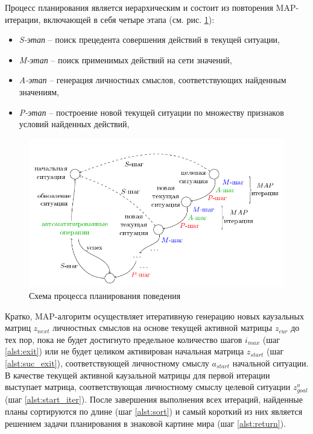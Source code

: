 \documentclass[12pt]{scrartcl}
\begin{document}
	Процесс планирования является иерархическим и состоит из повторения	MAP-итерации, включающей в себя четыре этапа (см. рис. \ref{fig:plan_algo}):
	\begin{itemize}
		\item \textit{S-этап} -- поиск прецедента совершения действий в текущей ситуации,
		\item \textit{M-этап} -- поиск применимых действий на сети значений,
		\item \textit{A-этап} -- генерация личностных смыслов, соответствующих найденным значениям,
		\item \textit{P-этап} -- построение новой текущей ситуации по множеству признаков условий найденных действий,
	\end{itemize}

	\begin{figure}
		\centering
		\includegraphics[width=\textwidth]{algo/ru/beh_plan2_ru}
		\caption{Схема процесса планирования поведения}	
		\label{fig:plan_algo}	
	\end{figure}
	
	Кратко, MAP-алгоритм осуществляет итеративную генерацию новых каузальных матриц $z_{next}$ личностных смыслов на основе текущей активной матрицы $z_{cur}$ до тех пор, пока не будет достигнуто предельное количество шагов $i_{max}$ (шаг \ref{alst:exit}) или не будет целиком активирован начальная матрица $z_{start}$ (шаг \ref{alst:suc_exit}), соответствующей личностному смыслу $a_{start}$ начальной ситуации. В качестве текущей активной каузальной матрицы для первой итерации выступает матрица, соответствующая личностному смыслу целевой ситуации $z_{goal}^a$ (шаг \ref{alst:start_iter}). После завершения выполнения всех итераций, найденные планы сортируются по длине (шаг \ref{alst:sort}) и самый короткий из них является решением задачи планирования в знаковой картине мира (шаг \ref{alst:return}).
\end{document}
